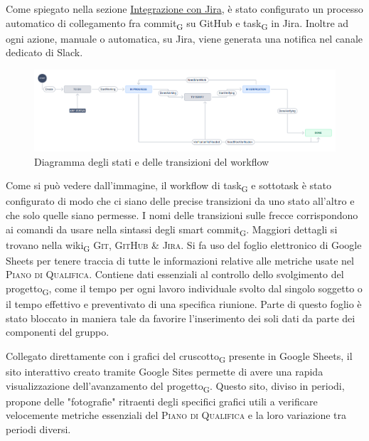         Come spiegato nella sezione \hyperref[jiraintegration]{Integrazione con Jira}, è stato configurato un processo automatico di collegamento fra commit\textsubscript{G} su GitHub e task\textsubscript{G} in Jira. Inoltre ad ogni azione, manuale o automatica, su Jira, viene generata una notifica nel canale dedicato di Slack.
        \begin{figure}[H]
            \centering
            \includegraphics[scale=0.32]{res/images/jira_workflow.png}
            \caption{Diagramma degli stati e delle transizioni del workflow}
        \end{figure}
            Come si può vedere dall'immagine, il workflow di task\textsubscript{G} e sottotask è stato configurato di modo che ci siano delle precise transizioni da uno stato all'altro e che solo quelle siano permesse. I nomi delle transizioni sulle frecce corrispondono ai comandi da usare nella sintassi degli smart commit\textsubscript{G}. Maggiori dettagli si trovano nella wiki\textsubscript{G} \textsc{Git, GitHub \& Jira}.
        Si fa uso del foglio elettronico di Google Sheets per tenere traccia di tutte le informazioni relative alle metriche usate nel \textsc{Piano di Qualifica}. Contiene dati essenziali al controllo dello svolgimento del progetto\textsubscript{G}, come il tempo per ogni lavoro individuale svolto dal singolo soggetto o il tempo effettivo e preventivato di una specifica riunione. Parte di questo foglio è stato bloccato in maniera tale da favorire l'inserimento dei soli dati da parte dei componenti del gruppo.

        Collegato direttamente con i grafici del cruscotto\textsubscript{G} presente in Google Sheets, il sito interattivo creato tramite Google Sites permette di avere una rapida visualizzazione dell'avanzamento del progetto\textsubscript{G}. Questo sito, diviso in periodi, propone delle "fotografie" ritraenti degli specifici grafici utili a verificare velocemente metriche essenziali del \textsc{Piano di Qualifica} e la loro variazione tra periodi diversi.

